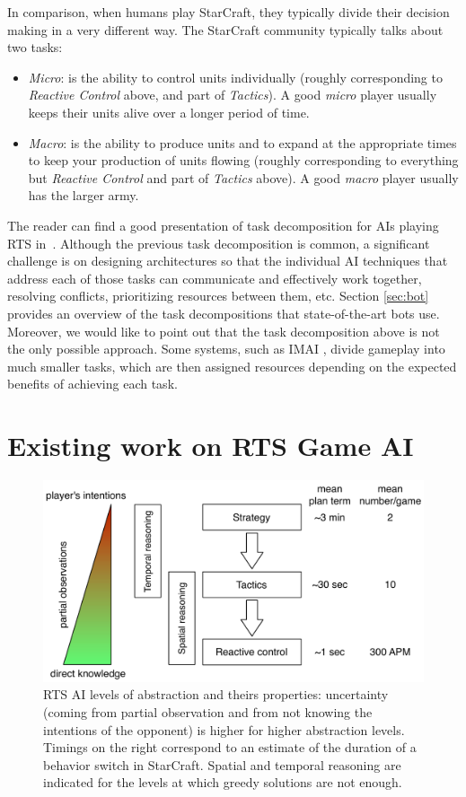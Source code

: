 \documentclass[journal]{IEEEtran}
\begin{document}
In comparison, when humans play StarCraft, they typically divide their decision making in a very different way. The StarCraft community typically talks about two tasks:
\begin{itemize}
  \item {\em Micro}: is the ability to control units individually (roughly corresponding to {\em Reactive Control} above, and part of {\em Tactics}). A good \emph{micro} player usually keeps their units alive over a longer period of time.
  \item {\em Macro}: is the ability to produce units and to expand at the appropriate times to keep your production of units flowing (roughly corresponding to everything but {\em Reactive Control} and part of {\em Tactics} above). A good \emph{macro} player usually has the larger army.
\end{itemize}

The reader can find a good presentation of task decomposition for AIs
playing RTS in~\cite{weber2011acs}. Although the previous task decomposition is common, a significant challenge is on designing architectures so that the individual AI techniques that address each of those tasks can communicate and effectively work together, resolving conflicts, prioritizing resources between them, etc. Section \ref{sec:bot} provides an overview of the task decompositions that state-of-the-art bots use. Moreover, we would like to point out that the task decomposition above is not the only possible approach. Some systems, such as IMAI \cite{miles2007co}, divide gameplay into much smaller tasks, which are then assigned resources depending on the expected benefits of achieving each task.


\section{Existing work on RTS Game AI}\label{sec:review}

\begin{figure}
    \centering
    \includegraphics[width=0.9\columnwidth]{figures/levels_abstraction.pdf}
    \caption{RTS AI levels of abstraction and theirs properties: uncertainty (coming from partial observation and from not knowing the intentions of the opponent) is higher for higher abstraction levels. Timings on the right correspond to an estimate of the duration of a behavior switch in StarCraft. Spatial and temporal reasoning are indicated for the levels at which greedy solutions are not enough.}
    \label{fig:levels-abstraction}
\end{figure}
\end{document}
